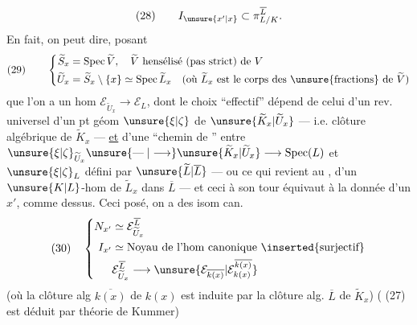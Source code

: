 \[
(28)\qquad I_{\unsure{x'|x}}\subset\pi_{L/K}^{\overline L}.
\]
En fait, on peut dire, posant
\[
(29)\qquad\left\{\begin{aligned}
\widetilde S_x&=\operatorname{Spec}\widetilde V,\quad\widetilde V\text{ hensélisé (pas strict) de }V\\
\widetilde U_x&=\widetilde S_x\setminus\{x\}\simeq\operatorname{Spec}\widetilde L_x\quad(\text{où }\widetilde L_x\text{ est le corps des \unsure{fractions} de }\widetilde V)
\end{aligned}\right.
\]
que l'on a un hom  $\mathcal E_{\widetilde U_x}\longrightarrow\mathcal E_L$,  dont le choix ``effectif'' dépend de
celui d'un rev. universel   d'un pt géom $\unsure{\xi|\zeta}$ de $\unsure{\widetilde K_x|\widetilde U_x}$ --- i.e.  clôture algébrique de $\widetilde K_x$ --- \uline{et} d'une  ``chemin de '' entre $\unsure{\xi|\zeta}_{\widetilde U_x}\unsure{\mathrel{\text{---}}|\longrightarrow}\unsure{\widetilde K_x|\widetilde U_x}\longrightarrow\operatorname{Spec}(L)$ et $\unsure{\xi|\zeta}_L$ défini par $\unsure{\widetilde L|\overline L}$ --- ou ce qui revient au ,  d'un $\unsure{K|L}$-hom de  $\widetilde L_x$ dans $\overline L$ --- et ceci à son tour équivaut à la donnée d'un $x'$,  comme dessus. Ceci posé, on a des isom can.
\[
(30)\quad\left\{\begin{aligned}
N_{x'}&\simeq\mathcal E_{\widetilde U_x}^{\overline L}\\
I_{x'}&\simeq\text{Noyau de l'hom canonique }\inserted{\text{surjectif}}\\
&\mathcal E_{\widetilde U_x}^{\overline L}\longrightarrow\unsure{\mathcal E_{\overline{k(x)}}|\mathcal E_{k(x)}^{\overline{k(x)}}}
\end{aligned}\right.
\]
(où la clôture alg $\overline{k(x)}$ de $k(x)$ est induite par la clôture alg. $\overline L$ de $\widetilde K_x$)
( (27) est déduit par théorie de Kummer)

